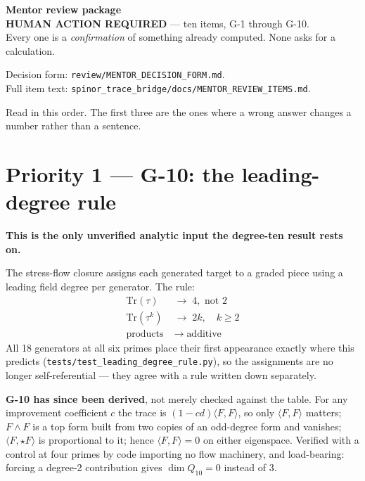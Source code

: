 \documentclass[11pt,a4paper]{article}
\begin{document}
\begin{center}
{\Large\textbf{Mentor review package}}\\[0.4em]
\textbf{HUMAN ACTION REQUIRED} --- ten items, G-1 through G-10.\\
Every one is a \emph{confirmation} of something already computed. None asks for a calculation.
\end{center}

Decision form: \texttt{review/MENTOR\_DECISION\_FORM.md}.\\
Full item text: \texttt{spinor\_trace\_bridge/docs/MENTOR\_REVIEW\_ITEMS.md}.

Read in this order. The first three are the ones where a wrong answer changes a
number rather than a sentence.

\hrulefill

\section*{Priority 1 --- G-10: the leading-degree rule}

\textbf{This is the only unverified analytic input the degree-ten result rests on.}

The stress-flow closure assigns each generated target to a graded piece using a
leading field degree per generator. The rule:
\begin{align*}
\mathrm{Tr}(\tau)   &\;\longrightarrow\; 4, \text{ not } 2\\
\mathrm{Tr}(\tau^k) &\;\longrightarrow\; 2k, \quad k \ge 2\\
\text{products}     &\;\longrightarrow\; \text{additive}
\end{align*}
All 18 generators at all six primes place their first appearance exactly where
this predicts (\texttt{tests/test\_leading\_degree\_rule.py}), so the assignments
are no longer self-referential --- they agree with a rule written down separately.

\textbf{G-10 has since been derived}, not merely checked against the table. For
any improvement coefficient $c$ the trace is $(1-cd)\langle F,F\rangle$, so only
$\langle F,F\rangle$ matters; $F\wedge F$ is a top form built from two copies of
an odd-degree form and vanishes; $\langle F,\star F\rangle$ is proportional to
it; hence $\langle F,F\rangle=0$ on either eigenspace. Verified with a control at
four primes by code importing no flow machinery, and load-bearing: forcing a
degree-2 contribution gives $\dim Q_{10}=0$ instead of $3$.
\end{document}
